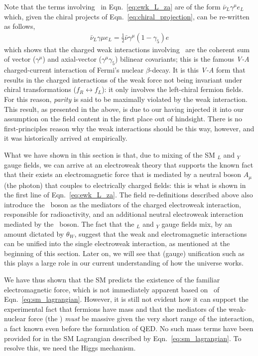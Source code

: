 Note that the terms involving \fieldWpm~in Eqn.~\ref{eq:ewk_L_za} are of the form $\bar{\nu}_L \gamma^{\mu} e_L$ which, given the chiral projects of Eqn.~\ref{eq:chiral_projection}, can be
re-written as follows,
\begin{align}
	\bar{\nu}_L \gamma{\mu} e_L = \frac{1}{2} \bar{\nu} \gamma^{\mu}(1-\gamma_5) e
	\label{eq:v_minus_a}
\end{align}
which shows that the charged weak interactions involving \fieldWpm~are the coherent
sum of vector ($\gamma^{\mu}$) and axial-vector ($\gamma^{\mu}\gamma_5$) bilinear covariants; this is the famous \textit{V-A} charged-current interaction of Fermi's nuclear $\beta$-decay.
It is this \textit{V-A} form that results in the charged interactions of the weak force
not being invariant under chiral transformations ($f_R \leftrightarrow f_L$): it only involves
the left-chiral fermion fields. For this reason, \textit{parity}
is said to be maximally violated by the weak interaction.
This result, as presented in the above, is due to our having injected
it into our assumption on the field content in the first place out of hindsight. There
is no first-principles reason why the weak interactions should be this way, however,
and it was historically arrived at empirically.

What we have shown in this section is that, due to mixing of the SM \SUtwo$_L$
and \Uone$_Y$ gauge fields, we can arrive at an electroweak theory that supports
the known fact that their exists an electromagnetic force that is mediated
by a neutral boson $A_{\mu}$ (the photon) that couples to electrically charged fields: this is what
is shown in the first line of Eqn.~\ref{eq:ewk_L_za}. The field re-definitions described above
also introduce the \fieldWpm~boson as the mediators of the charged electroweak interaction,
responsible for radioactivity, and an additional neutral electroweak interaction mediated
by the \fieldZ~boson.
The fact that the \SUtwo$_L$ and \Uone$_Y$ gauge fields mix, by an amount dictated by $\theta_W$,
suggest that the weak and electromagnetic interactions can be unified into the single
electroweak interaction, as mentioned at the beginning of this section. Later on, we will see
that (gauge) unification such as this plays a large role in our current understanding
of how the universe works.

We have thus shown that the SM predicts the existence of the familiar electromagnetic force,
which is not immediately apparent based on \SML~of Eqn.~\ref{eq:sm_lagrangian}. 
However, it is still not evident how it can
support the experimental fact that fermions have mass and that the mediators of the
weak-nuclear force (the \fieldWpm) \textit{must} be massive given the very short
range of the interaction, a fact known
even before the formulation of QED. No such mass terms
have been provided for in the SM Lagrangian described by Eqn.~\ref{eq:sm_lagrangian}. To resolve this, we need the Higgs mechanism.